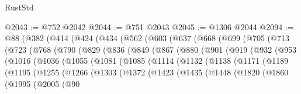 \begin{lexlean}{RustStd}
\begin{coremodule}
{\begin{coremodule}
{{{{{{{{{{{{{{{{{{{{{{{{{{{{{{{{{{{{{{{{{{{{{{{{{{@2043 := @752 @2042
@2044 := @751 @2043
@2045 := @1306 @2044
@2094 := @88
    (@382
      (@414
        (@424
          (@434
            (@562
              (@603
                (@637
                  (@668
                    (@699
                      (@705
                        (@713
                          (@723
                            (@768
                              (@790
                                (@829
                                  (@836
                                    (@849
                                      (@867
                                        (@880
                                          (@901
                                            (@919
                                              (@932
                                                (@953
                                                  (@1016
                                                    (@1036
                                                      (@1055
                                                        (@1081
                                                          (@1085
                                                            (@1114
                                                              (@1132
                                                                (@1138
                                                                  (@1171
                                                                    (@1189
                                                                      (@1195
                                                                        (@1255
                                                                          (@1266
                                                                            (@1303
                                                                              (@1372
                                                                                (@1423
                                                                                  (@1435
                                                                                    (@1448
                                                                                      (@1820
                                                                                        (@1860
                                                                                          (@1995
                                                                                            (@2005
                                                                                              (@90
}}}}}}}}}}}}}}}}}}}}}}}}}}}}}}}}}}}}}}}}}}}}}}}}}}
\end{coremodule}}
\end{coremodule}
\end{lexlean}
